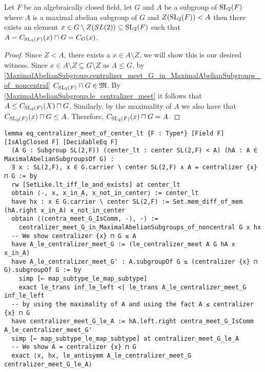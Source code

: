 \begin{lemma}
  \label{MaximalAbelianSubgroup.eq_centralizer_meet_of_center_lt}
  \leanok
  Let $F$ be an algebraically closed field, let $G$ and $A$ be a subgroup of $\operatorname{SL}_2(F)$ where $A$ is a maximal abelian subgroup of $G$ and $Z(\operatorname{SL}_2(F)) < A$ 
  then there exists an element $x \in G \setminus Z(SL(2)) \subseteq \operatorname{SL}_2(F)$ such that
  $A = C_{\operatorname{SL}_2(F)}(x) \sqcap G = C_{G}(x)$.
\end{lemma}
\begin{proof}
  \leanok
  Since $Z < A$, there exists a $x \in A \setminus Z$, we will show this is our desired witness. Since $x \in A \setminus Z \subseteq G \setminus Z$ as $A \le G$, by \ref{MaximalAbelianSubgroup.centralizer_meet_G_in_MaximalAbelianSubgroups_of_noncentral}
  $C_{\operatorname{SL}_2(F)} \sqcap G \in \mathfrak{M}$. By \ref{MaximalAbelianSubgroup.le_centralizer_meet} it follows that $A \le C_{\operatorname{SL}_2(F)}(X) \sqcap G$. Similarly, by the maximality of $A$ we also have
  that $C_{\operatorname{SL}_2(F)}(x) \sqcap G \le A$. Therefore, $C_{\operatorname{SL}_2(F)}(x) \sqcap G = A$.
\end{proof}
\begin{footnotesize}
\begin{verbatim}
lemma eq_centralizer_meet_of_center_lt {F : Type*} [Field F] [IsAlgClosed F] [DecidableEq F]
  (A G : Subgroup SL(2,F)) (center_lt : center SL(2,F) < A) (hA : A ∈ MaximalAbelianSubgroupsOf G) :
  ∃ x : SL(2,F), x ∈ G.carrier \ center SL(2,F) ∧ A = centralizer {x} ⊓ G := by
  rw [SetLike.lt_iff_le_and_exists] at center_lt
  obtain ⟨-, x, x_in_A, x_not_in_center⟩ := center_lt
  have hx : x ∈ G.carrier \ center SL(2,F) := Set.mem_diff_of_mem (hA.right x_in_A) x_not_in_center
  obtain ⟨⟨centra_meet_G_IsComm, -⟩, -⟩ :=
    centralizer_meet_G_in_MaximalAbelianSubgroups_of_noncentral G x hx
  -- We show centralizer {x} ⊓ G ≤ A
  have A_le_centralizer_meet_G := (le_centralizer_meet A G hA x x_in_A)
  have A_le_centralizer_meet_G' : A.subgroupOf G ≤ (centralizer {x} ⊓ G).subgroupOf G := by
    simp [← map_subtype_le_map_subtype]
    exact le_trans inf_le_left <| le_trans A_le_centralizer_meet_G inf_le_left
  -- by using the maximality of A and using the fact A ≤ centralizer {x} ⊓ G
  have centralizer_meet_G_le_A := hA.left.right centra_meet_G_IsComm A_le_centralizer_meet_G'
  simp [← map_subtype_le_map_subtype] at centralizer_meet_G_le_A
  -- We show A = centralizer {x} ⊓ G
  exact ⟨x, hx, le_antisymm A_le_centralizer_meet_G centralizer_meet_G_le_A⟩
\end{verbatim}
\end{footnotesize}


